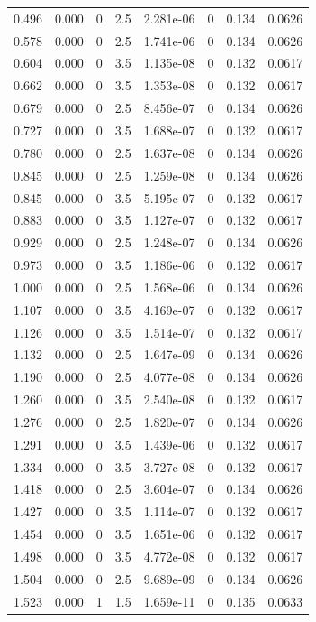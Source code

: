 \documentclass[preview]{standalone}
\begin{document}
{{\begin{tabular}{L{1.2cm}C{1.2cm} C{0.3cm}C{0.5cm} C{1.4cm}C{1.4cm} C{1.4cm}C{1.4cm}}
  0.496  &  0.000  & 0     & 2.5 &  2.281e-06  & 0  & 0.134 &  0.0626   \\ 
  0.578  &  0.000  & 0     & 2.5 &  1.741e-06  & 0  & 0.134 &  0.0626   \\ 
  0.604  &  0.000  & 0     & 3.5 &  1.135e-08  & 0  & 0.132 &  0.0617   \\ 
  0.662  &  0.000  & 0     & 3.5 &  1.353e-08  & 0  & 0.132 &  0.0617   \\ 
  0.679  &  0.000  & 0     & 2.5 &  8.456e-07  & 0  & 0.134 &  0.0626   \\ 
  0.727  &  0.000  & 0     & 3.5 &  1.688e-07  & 0  & 0.132 &  0.0617   \\ 
  0.780  &  0.000  & 0     & 2.5 &  1.637e-08  & 0  & 0.134 &  0.0626   \\ 
  0.845  &  0.000  & 0     & 2.5 &  1.259e-08  & 0  & 0.134 &  0.0626   \\ 
  0.845  &  0.000  & 0     & 3.5 &  5.195e-07  & 0  & 0.132 &  0.0617   \\ 
  0.883  &  0.000  & 0     & 3.5 &  1.127e-07  & 0  & 0.132 &  0.0617   \\ 
  0.929  &  0.000  & 0     & 2.5 &  1.248e-07  & 0  & 0.134 &  0.0626   \\ 
  0.973  &  0.000  & 0     & 3.5 &  1.186e-06  & 0  & 0.132 &  0.0617   \\ 
  1.000  &  0.000  & 0     & 2.5 &  1.568e-06  & 0  & 0.134 &  0.0626   \\ 
  1.107  &  0.000  & 0     & 3.5 &  4.169e-07  & 0  & 0.132 &  0.0617   \\ 
  1.126  &  0.000  & 0     & 3.5 &  1.514e-07  & 0  & 0.132 &  0.0617   \\ 
  1.132  &  0.000  & 0     & 2.5 &  1.647e-09  & 0  & 0.134 &  0.0626   \\ 
  1.190  &  0.000  & 0     & 2.5 &  4.077e-08  & 0  & 0.134 &  0.0626   \\ 
  1.260  &  0.000  & 0     & 3.5 &  2.540e-08  & 0  & 0.132 &  0.0617   \\ 
  1.276  &  0.000  & 0     & 2.5 &  1.820e-07  & 0  & 0.134 &  0.0626   \\ 
  1.291  &  0.000  & 0     & 3.5 &  1.439e-06  & 0  & 0.132 &  0.0617   \\ 
  1.334  &  0.000  & 0     & 3.5 &  3.727e-08  & 0  & 0.132 &  0.0617   \\ 
  1.418  &  0.000  & 0     & 2.5 &  3.604e-07  & 0  & 0.134 &  0.0626   \\ 
  1.427  &  0.000  & 0     & 3.5 &  1.114e-07  & 0  & 0.132 &  0.0617   \\ 
  1.454  &  0.000  & 0     & 3.5 &  1.651e-06  & 0  & 0.132 &  0.0617   \\ 
  1.498  &  0.000  & 0     & 3.5 &  4.772e-08  & 0  & 0.132 &  0.0617   \\ 
  1.504  &  0.000  & 0     & 2.5 &  9.689e-09  & 0  & 0.134 &  0.0626   \\ 
  1.523  &  0.000  & 1     & 1.5 &  1.659e-11  & 0  & 0.135 &  0.0633   \\ 
\hline 
\end{tabular} 

}}
\end{document}
